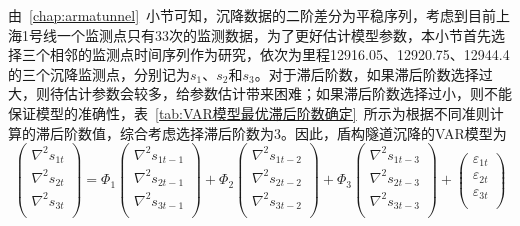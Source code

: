 由~\ref{chap:armatunnel}~小节可知，沉降数据的二阶差分为平稳序列，考虑到目前上海1号线一个监测点只有33次的监测数据，为了更好估计模型参数，本小节首先选择三个相邻的监测点时间序列作为研究，依次为里程12916.05、12920.75、12944.4的三个沉降监测点，分别记为$s_1$、$s_2$和$s_3$。对于滞后阶数，如果滞后阶数选择过大，则待估计参数会较多，给参数估计带来困难；如果滞后阶数选择过小，则不能保证模型的准确性，表~\ref{tab:VAR模型最优滞后阶数确定}~所示为根据不同准则计算的滞后阶数值，综合考虑选择滞后阶数为3。因此，盾构隧道沉降的VAR模型为
\begin{equation}
	\label{equ:var}
	\left( \begin{matrix}
   {{\nabla }^{2}}{{s}_{1t}}  \\
   {{\nabla }^{2}}{{s}_{2t}}  \\
   {{\nabla }^{2}}{{s}_{3t}}  \\
\end{matrix} \right)={{\Phi }_{1}}\left( \begin{matrix}
   {{\nabla }^{2}}{{s}_{1t-1}}  \\
   {{\nabla }^{2}}{{s}_{2t-1}}  \\
   {{\nabla }^{2}}{{s}_{3t-1}}  \\
\end{matrix} \right)+{{\Phi }_{2}}\left( \begin{matrix}
   {{\nabla }^{2}}{{s}_{1t-2}}  \\
   {{\nabla }^{2}}{{s}_{2t-2}}  \\
   {{\nabla }^{2}}{{s}_{3t-2}}  \\
\end{matrix} \right)+{{\Phi }_{3}}\left( \begin{matrix}
   {{\nabla }^{2}}{{s}_{1t-3}}  \\
   {{\nabla }^{2}}{{s}_{2t-3}}  \\
   {{\nabla }^{2}}{{s}_{3t-3}}  \\
\end{matrix} \right)+\left( \begin{matrix}
   {{\varepsilon }_{1t}}  \\
   {{\varepsilon }_{2t}}  \\
   {{\varepsilon }_{3t}}  \\
\end{matrix} \right)
\end{equation}

